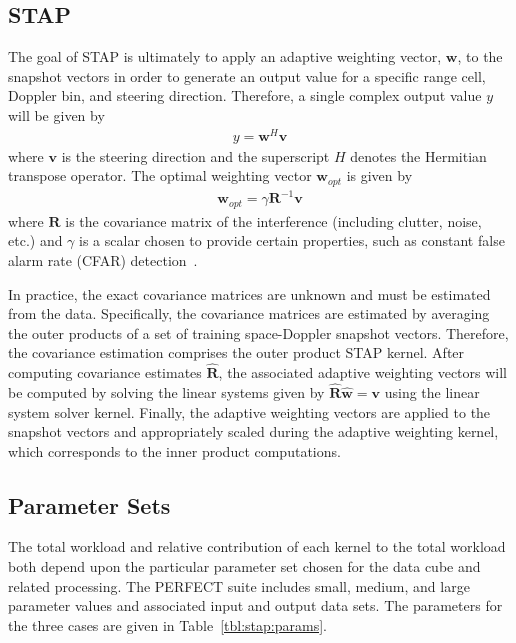 \documentclass{report}
\begin{document}
\subsection{STAP}

The goal of STAP is ultimately to apply an
adaptive weighting vector, $\mathbf{w}$, to the snapshot
vectors in order to generate an output value for a specific
range cell, Doppler bin, and steering direction.
Therefore, a single complex output value $y$ will be given by
\begin{align}
    y = \mathbf{w}^{H} \mathbf{v}
\end{align}
where $\mathbf{v}$ is the steering direction and the superscript
$H$ denotes the Hermitian transpose operator.
The optimal weighting vector $\mathbf{w}_{opt}$ is given by
\begin{align}
    \mathbf{w}_{opt} = \gamma \mathbf{R}^{-1} \mathbf{v}
\end{align}
where $\mathbf{R}$ is the covariance matrix of the interference
(including clutter, noise, etc.) and $\gamma$ is a scalar
chosen to provide certain properties, such as
constant false alarm rate (CFAR) detection~\cite{MelvinSTAP}.

In practice, the exact covariance matrices are unknown
and must be estimated from the data.
Specifically, the covariance matrices are estimated by averaging
the outer products of a set of training space-Doppler snapshot
vectors.
Therefore, the covariance estimation comprises the outer product
STAP kernel.
After computing covariance estimates $\hat{\mathbf{R}}$, the
associated adaptive weighting vectors will be computed by solving
the linear systems given by $\hat{\mathbf{R}} \hat{\mathbf{w}} = \mathbf{v}$
using the linear system solver kernel.
Finally, the adaptive weighting vectors are applied to the snapshot
vectors and appropriately scaled during the adaptive weighting
kernel, which corresponds to the inner product computations.

\subsection{Parameter Sets}

The total workload and relative contribution of each kernel to the total
workload both depend upon the particular parameter set chosen for
the data cube and related processing.
The PERFECT suite includes small, medium, and large parameter values and
associated input and output data sets.
The parameters for the three cases are given in Table~\ref{tbl:stap:params}.
\end{document}

